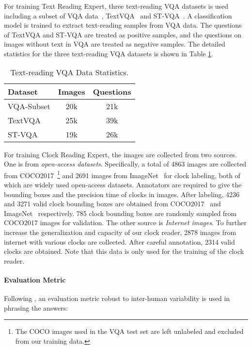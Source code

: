 For training Text Reading Expert, three text-reading VQA datasets is used including a subset of VQA data~\citep{antol2015vqa}, TextVQA~\citep{textvqa} and ST-VQA~\citep{stvqa}. A classification model is trained to extract text-reading samples from VQA data. The questions of TextVQA and ST-VQA are treated as positive samples, and the questions on images without text in VQA are treated as negative samples. The detailed statistics for the three text-reading VQA datasets is shown in Table \ref{tab:textvqa_stat}.

\begin{table}[ht]
\caption{\label{table:compare} Text-reading VQA Data Statistics.}
\centering
\begin{tabular}{l|c|c}
\toprule 
\textbf{Dataset} & \textbf{Images} & \textbf{Questions} \\
\midrule
VQA-Subset & 20k & 21k  \\
TextVQA & 25k & 39k  \\
ST-VQA & 19k & 26k  \\
\bottomrule
\end{tabular}
\label{tab:textvqa_stat}
\end{table}

For training Clock Reading Expert, the images are collected from two sources. One is from \textit{open-access datasets}. Specifically, a total of 4863 images are collected from COCO2017~\citep{lin2014microsoft}\footnote{The COCO images used in the VQA test set are left unlabeled and excluded from our training data.} and 2691 images from ImageNet~\citep{deng2009imagenet} for clock labeling, both of which are widely used open-access datasets. Annotators are required to give the bounding boxes and the precision time of clocks in images. After labeling, 4236 and 3271 valid clock bounding boxes are obtained from COCO2017~\citep{lin2014microsoft} and ImageNet~\citep{deng2009imagenet} respectively. 785 clock bounding boxes are randomly sampled from COCO2017 images for validation.
The other source is \textit{Internet images}. To further increase the generalization and capacity of our clock reader, 2878 images from internet with various clocks are collected. After careful annotation, 2314 valid clocks are obtained. Note that this data is only used for the training of the clock reader.

\paragraph{Evaluation Metric}
Following \citep{antol2015vqa}, an evaluation metric robust to inter-human variability is used in phrasing the answers: 

